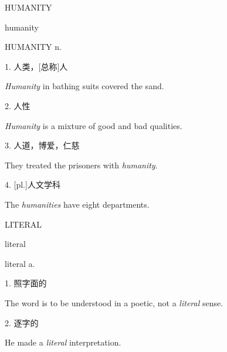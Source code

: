 \begin{flashcard}{
HUMANITY

humanity
}
\begin{center}
HUMANITY n. 
\end{center}
1. 人类，[总称]人

\textit{Humanity} in bathing suits covered the sand.

2. 人性

\textit{Humanity} is a mixture of good and bad qualities.

3. 人道，博爱，仁慈

They treated the prisoners with \textit{humanity}.

4. [pl.]人文学科

The \textit{humanities} have eight departments.

\end{flashcard}
\begin{flashcard}{
LITERAL

literal
}
\begin{center}
literal a. 
\end{center}
1. 照字面的

The word is to be understood in a poetic, not a \textit{literal} sense.

2. 逐字的

He made a \textit{literal} interpretation.

\end{flashcard}
